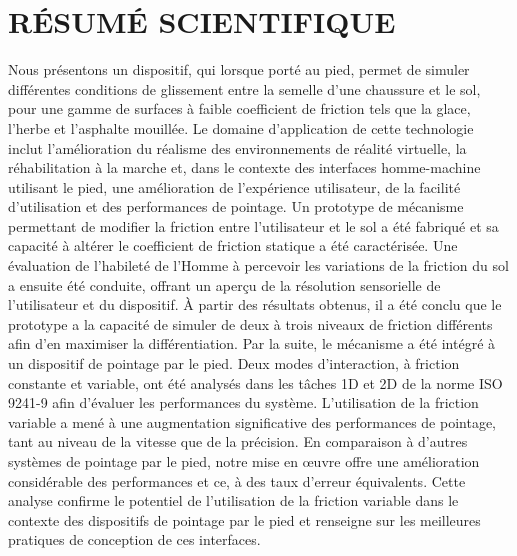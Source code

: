 \documentclass [12pt,letterpaper]{report}
\begin{document}
\newpage

\section*{\centering R\'{E}SUM\'{E} SCIENTIFIQUE} %

Nous pr\'{e}sentons un dispositif, qui lorsque port\'{e} au pied, permet de simuler diff\'{e}rentes conditions de glissement entre la semelle d'une chaussure et le sol, pour une gamme de surfaces \`{a} faible coefficient de friction tels que la glace, l'herbe et l'asphalte mouill\'{e}e. Le domaine d'application de cette technologie inclut l'am\'{e}lioration du r\'{e}alisme des environnements de r\'{e}alit\'{e} virtuelle, la r\'{e}habilitation \`{a} la marche et, dans le contexte des interfaces homme-machine utilisant le pied, une am\'{e}lioration de l'exp\'{e}rience utilisateur, de la facilit\'{e} d'utilisation et des performances de pointage. Un prototype de m\'{e}canisme permettant de modifier la friction entre l'utilisateur et le sol a \'{e}t\'{e} fabriqu\'{e} et sa capacit\'{e} \`{a} alt\'{e}rer le coefficient de friction statique a \'{e}t\'{e} caract\'{e}ris\'{e}e. Une \'{e}valuation de l'habilet\'{e} de l'Homme \`{a} percevoir les variations de la friction du sol a ensuite \'{e}t\'{e} conduite, offrant un aper\c{c}u de la r\'{e}solution sensorielle de l'utilisateur et du dispositif. \`{A} partir des r\'{e}sultats obtenus, il a \'{e}t\'{e} conclu que le prototype a la capacit\'{e} de simuler de deux \`{a} trois niveaux de friction diff\'{e}rents afin d'en maximiser la diff\'{e}rentiation. Par la suite, le m\'{e}canisme a \'{e}t\'{e} int\'{e}gr\'{e} \`{a} un dispositif de pointage par le pied. Deux modes d'interaction, \`{a} friction constante et variable, ont \'{e}t\'{e} analys\'{e}s dans les t\^{a}ches 1D et 2D de la norme ISO 9241-9 afin d'\'{e}valuer les performances du syst\`{e}me. L'utilisation de la friction variable a men\'{e} \`{a} une augmentation significative des performances de pointage, tant au niveau de la vitesse que de la pr\'{e}cision. En comparaison \`{a} d'autres syst\`{e}mes de pointage par le pied, notre mise en \oe uvre offre une am\'{e}lioration consid\'{e}rable des performances et ce, \`{a} des taux d'erreur \'{e}quivalents. Cette analyse confirme le potentiel de l'utilisation de la friction variable dans le contexte des dispositifs de pointage par le pied et renseigne sur les meilleures pratiques de conception de ces interfaces.


\newpage
\end{document}
